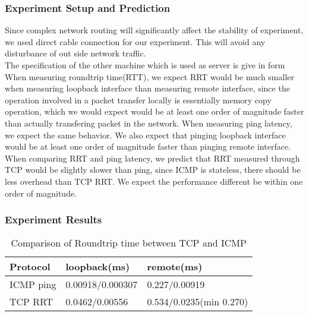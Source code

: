 \documentclass{article} %
\begin{document}
\subsubsection{Experiment Setup and Prediction}
Since complex network routing will significantly affect the stability of experiment, we used direct cable connection for our experiment. This will avoid any disturbance of out side network traffic. \\
The specification of the other machine which is used as server is give in form \\ %
When measuring roundtrip time(RTT), we expect RRT would be much smaller when measuring loopback interface than measuring remote interface, since the operation involved in a packet transfer locally is essentially memory copy operation, which we would expect would be at least one order of magnitude faster than actually transfering packet in the network. When measuring ping latency, we expect the same behavior. We also expect that pinging loopback interface would be at least one order of magnitude faster than pinging remote interface. \\
When comparing RRT and ping latency, we predict that RRT measured through TCP
would be slightly slower than ping, since ICMP is stateless, there should be
less overhead than TCP RRT\@. We expect the performance different be within one
order of magnitude.\\
\subsubsection{Experiment Results}

\begin{table}
  \begin{center}
    \caption{Comparison of Roundtrip time between TCP and ICMP}
    \begin{tabular}{|l|l|l|}
      \hline
      Protocol  & loopback(ms)     & remote(ms)              \\ \hline
      ICMP ping & 0.00918/0.000307 & 0.227/0.00919           \\ \hline
      TCP RRT   & 0.0462/0.00556   & 0.534/0.0235(min 0.270) \\ \hline
    \end{tabular}
    \label{table:roundtrip}
  \end{center}
\end{table}
\end{document}
